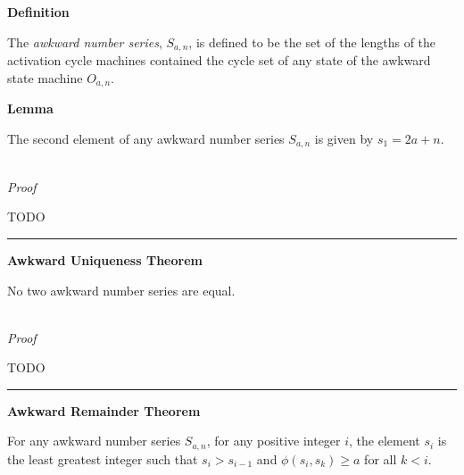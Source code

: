 \documentclass[a4paper,12pt]{article}
\begin{document}
\label{definition:awkward_number_series}
\hypertarget{definition:awkward_number_series}{}
\begin{tcolorbox}
\textbf{Definition}

\noindent The \textit{awkward number series}, $S_{a, n}$, is defined to be the set of the lengths of the activation cycle machines contained the cycle set of any state of the awkward state machine $O_{a, n}$.
\end{tcolorbox}






\label{lemma:second_element_of_asm}
\hypertarget{lemma:second_element_of_asm}{}
\begin{tcolorbox}
\textbf{Lemma}

The second element of any awkward number series $S_{a,n}$ is given by $s_1 = 2a + n$.
\end{tcolorbox}

\noindent \\
\textit{Proof}

TODO

\begin{center}
\noindent\rule{8cm}{0.4pt}
\end{center}






\label{theorem:uniquness_of_awkward_numbers}
\hypertarget{theorem:uniqueness_of_awkward_numbers}{}
\begin{tcolorbox}
\textbf{Awkward Uniqueness Theorem}

No two awkward number series are equal.
\end{tcolorbox}

\noindent \\
\textit{Proof}

TODO

\begin{center}
\noindent\rule{8cm}{0.4pt}
\end{center}






\label{theorem:modularity_of_awkward_numbers}
\hypertarget{theorem:modularity_of_awkward_numbers}{}
\begin{tcolorbox}
\textbf{Awkward Remainder Theorem}

For any awkward number series $S_{a,n}$, for any positive integer $i$, the element $s_i$ is the least greatest integer such that $s_i > s_{i-1}$ and $\phi(s_i, s_k) \geq a$ for all $k < i$. 
\end{tcolorbox}
\end{document}
